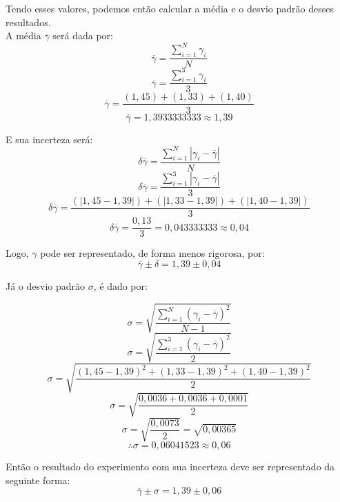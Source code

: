 Tendo esses valores, podemos então calcular a média e o desvio padrão desses resultados.\\

A média $\overline{\gamma}$ será dada por:\\

\[ \overline{\gamma} = \frac{\sum_{i=1}^{N} \gamma_i}{N}\]
\[ \overline{\gamma} = \frac{\sum_{i=1}^{3} \gamma_i}{3}\]
\[ \overline{\gamma} = \frac{(1,45) + (1,33) + (1,40)}{3}\]
\[ \overline{\gamma} = 1,3933333333 \approx 1,39\]

E sua incerteza será:\\
\[ \delta\overline{\gamma} = \frac{\sum_{i=1}^{N} |\gamma_i - \overline{\gamma}|}{N}\]
\[ \delta\overline{\gamma} = \frac{\sum_{i=1}^{3} |\gamma_i - \overline{\gamma}|}{3}\]
\[ \delta\overline{\gamma} = \frac{(|1,45 - 1,39|) + (|1,33 - 1,39|) + (|1,40 -1,39|) }{3}\]
\[ \delta\overline{\gamma} = \frac{0,13}{3} = 0,043333333 \approx 0,04\]

Logo, $\gamma$ pode ser representado, de forma menos rigorosa, por:
\[ \overline{\gamma} \pm \delta  = 1,39 \pm 0,04 \]

Já o desvio padrão $\sigma$, é dado por:

\[ \sigma = \sqrt{\frac{\sum_{i=1}^{N} (\gamma_i - \overline{\gamma})^2}{N-1}}\]
\[ \sigma = \sqrt{\frac{\sum_{i=1}^{3} (\gamma_i - \overline{\gamma})^2}{2}}\]
\[ \sigma = \sqrt{\frac{(1,45-1,39)^2 + (1,33-1,39)^2 + (1,40-1,39)^2}{2}}\]
\[ \sigma = \sqrt{\frac{0,0036 + 0,0036 + 0,0001}{2}}\]
\[ \sigma = \sqrt{\frac{0,0073}{2}} = \sqrt{0,00365} \]
\[ \therefore \sigma = 0,06041523 \approx 0,06 \]

Então o resultado do experimento com sua incerteza deve ser representado da seguinte forma:
\[ \overline{\gamma} \pm \sigma = 1,39 \pm 0,06\]

